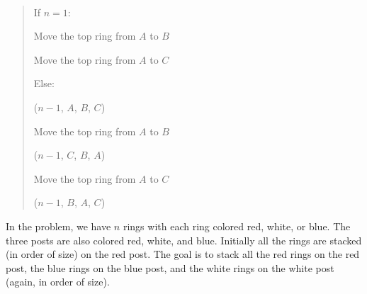 \documentclass[10pt]{article}
\begin{document}
\begin{solution}\ %
\begin{quote}
\noindent{}%

%

\begin{steps}
  \item If $n = 1$:
    \begin{steps}
    \item Move the top ring from $ A $ to $ B $
    \item Move the top ring from $ A $ to $ C $
    \end{steps}
  \item Else:
    \begin{steps}
    \item {}($n-1$, $A$, $B$, $C$) 
    \item Move the top ring from $ A $ to $ B $
    \item {}($n-1$, $C$, $B$, $A$) 
    \item Move the top ring from $ A $ to $ C $
    \item {}($n-1$, $B$, $A$, $C$) 
    \end{steps}
\end{steps}

\end{quote}
\end{solution}
\pagebreak

In the  problem, we have $ n $ rings with each ring colored red, white, or blue. The three posts are also colored red, white, and blue. Initially all the rings are stacked (in order of size) on the red post. The goal is to stack all the red rings on the red post, the blue rings on the blue post, and the white rings on the white post (again, in order of size).
\end{document}
